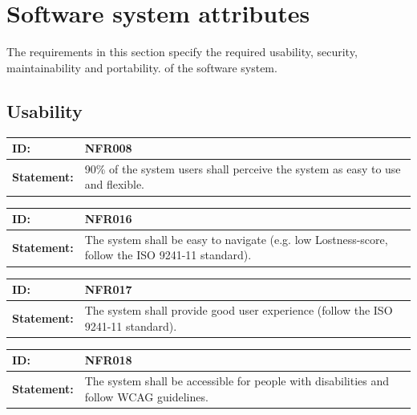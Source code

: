 \documentclass{scrreprt}
\begin{document}
\section{Software system attributes}
The requirements in this section specify the required usability, security, maintainability and portability.
of the software system.

\subsection{Usability}
\begin{center}
\begin{tabularx}{\linewidth}{| l | X |}
 \hline
 \textbf{ID:} & NFR008  \\ 
 \hline
 \textbf{Statement:} & 90\% of the system users shall perceive the system as easy to use and flexible.
 \\ 
 \hline
\end{tabularx}
\end{center}

\begin{center}
\begin{tabularx}{\linewidth}{| l | X |}
 \hline
 \textbf{ID:} & NFR016  \\ 
 \hline
 \textbf{Statement:} & The system shall be easy to navigate (e.g. low Lostness-score, follow the ISO 9241-11 standard).
 \\ 
 \hline
\end{tabularx}
\end{center}

\begin{center}
\begin{tabularx}{\linewidth}{| l | X |}
 \hline
 \textbf{ID:} & NFR017  \\ 
 \hline
 \textbf{Statement:} & The system shall provide good user experience (follow the ISO 9241-11 standard).
 \\ 
 \hline
\end{tabularx}
\end{center}

\begin{center}
\begin{tabularx}{\linewidth}{| l | X |}
 \hline
 \textbf{ID:} & NFR018  \\ 
 \hline
 \textbf{Statement:} & The system shall be accessible for people with disabilities and follow WCAG guidelines. 
 \\ 
 \hline
\end{tabularx}
\end{center}
\end{document}
